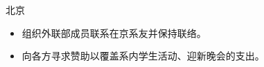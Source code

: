 \documentclass[11pt,a4paper,sans]{moderncv/moderncv}
\begin{document}
{北京}{}
{
\begin{itemize}
	\item 组织外联部成员联系在京系友并保持联络。
	\item 向各方寻求赞助以覆盖系内学生活动、迎新晚会的支出。
\end{itemize}
}

% 
% 
% 
% 
% 
% 
\end{document}
